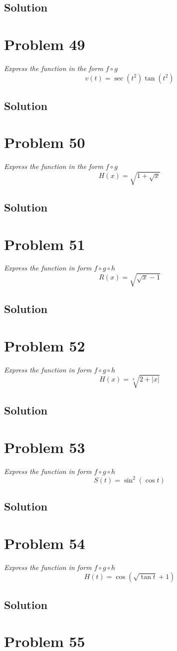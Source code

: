 \documentclass[11pt]{article}
\newcommand{\soln}{\subsection*}
\newcommand{\qn}{\textit}
\begin{document}
\soln{Solution}

\section*{Problem 49}

\qn{Express the function in the form $f \circ g$ $$v(t)=\sec(t^2)\tan(t^2)$$}

\soln{Solution}

\section*{Problem 50}

\qn{Express the function in the form $f \circ g$ $$H(x)=\sqrt{1+\sqrt{x}}$$}

\soln{Solution}

\section*{Problem 51}

\qn{Express the function in form $f \circ g \circ h$ $$R(x)=\sqrt{\sqrt{x}-1}$$}

\soln{Solution}

\section*{Problem 52}

\qn{Express the function in form $f \circ g \circ h$ $$H(x)=\sqrt[8]{2+|x|}$$}

\soln{Solution}

\section*{Problem 53}

\qn{Express the function in form $f \circ g \circ h$ $$S(t)=\sin^2(\cos{t})$$}

\soln{Solution}

\section*{Problem 54}

\qn{Express the function in form $f \circ g \circ h$ $$H(t)=\cos(\sqrt{\tan{t}}+1)$$}

\soln{Solution}

\section*{Problem 55}
\end{document}
